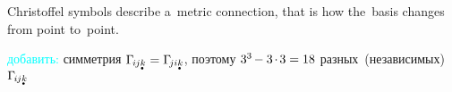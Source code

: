 \begin{otherlanguage}{russian}
\vspace{.2em} Christoffel symbols describe a~metric connection, that is how the~basis changes from point to~point.

\vspace{.2em} \noindent \textcolor{cyan}{добавить:} симметрия ${ \Gamma_{\hspace{-0.25ex}i\hspace{-0.1ex}j\mathdotbelow{k}} = \Gamma_{\hspace{-0.33ex}ji\mathdotbelow{k}} }$, поэтому ${3^3 \hspace{-0.2ex} - 3 \hspace{-0.2ex}\cdot\hspace{-0.2ex} 3 = 18}$ разных~(независимых) ${\Gamma_{\hspace{-0.25ex}i\hspace{-0.1ex}j\mathdotbelow{k}}}$


\end{otherlanguage}
